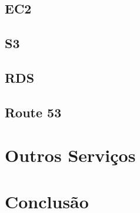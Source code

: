 \subsection{EC2}
\subsection{S3}
\subsection{RDS}
\subsection{Route 53}

\section{Outros Serviços}
\section{Conclusão}
